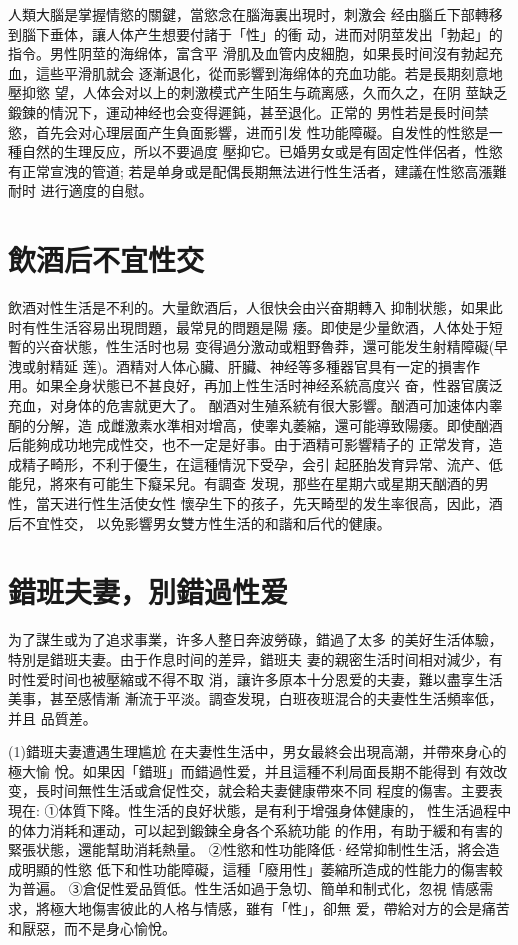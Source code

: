 \documentclass[12pt,UTF8]{ctexbook}
\begin{document}
人類大腦是掌握情慾的關鍵，當慾念在腦海裏出現时，刺激会
经由腦丘下部轉移到腦下垂体，讓人体产生想要付諸于「性」的衝
动，进而对阴莖发出「勃起」的指令。男性阴莖的海绵体，富含平
滑肌及血管内皮細胞，如果長时间沒有勃起充血，這些平滑肌就会
逐漸退化，從而影響到海绵体的充血功能。若是長期刻意地壓抑慾
望，人体会对以上的刺激模式产生陌生与疏离感，久而久之，在阴
莖缺乏鍛鍊的情況下，運动神经也会变得遲鈍，甚至退化。正常的
男性若是長时间禁慾，首先会对心理层面产生負面影響，进而引发
性功能障礙。自发性的性慾是一種自然的生理反应，所以不要過度
壓抑它。已婚男女或是有固定性伴侶者，性慾有正常宣洩的管道;
若是单身或是配偶長期無法进行性生活者，建議在性慾高漲難耐时
进行適度的自慰。

\section{飲酒后不宜性交}

飲酒对性生活是不利的。大量飲酒后，人很快会由兴奋期轉入
抑制状態，如果此时有性生活容易出現問題，最常見的問題是陽
痿。即使是少量飲酒，人体处于短暫的兴奋状態，性生活时也易
变得過分激动或粗野魯莽，還可能发生射精障礙(早洩或射精延
莲)。酒精对人体心臟、肝臟、神经等多種器官具有一定的損害作
用。如果全身状態已不甚良好，再加上性生活时神经系統高度兴
奋，性器官廣泛充血，对身体的危害就更大了。
酗酒对生殖系統有很大影響。酗酒可加速体内睾酮的分解，造
成雌激素水準相对增高，使睾丸萎縮，還可能導致陽痿。即使酗酒
后能夠成功地完成性交，也不一定是好事。由于酒精可影響精子的
正常发育，造成精子畸形，不利于優生，在這種情況下受孕，会引
起胚胎发育异常、流产、低能兒，將來有可能生下癡呆兒。有調查
发現，那些在星期六或星期天酗酒的男性，當天进行性生活使女性
懷孕生下的孩子，先天畸型的发生率很高，因此，酒后不宜性交，
以免影響男女雙方性生活的和諧和后代的健康。

\section{錯班夫妻，別錯過性爱}

为了謀生或为了追求事業，许多人整日奔波勞碌，錯過了太多
的美好生活体驗，特別是錯班夫妻。由于作息时间的差异，錯班夫
妻的親密生活时间相对減少，有时性爱时间也被壓縮或不得不取
消，讓许多原本十分恩爱的夫妻，難以盡享生活美事，甚至感情漸
漸流于平淡。調查发現，白班夜班混合的夫妻性生活頻率低，并且
品質差。

(1)錯班夫妻遭遇生理尴尬
在夫妻性生活中，男女最終会出現高潮，并帶來身心的極大愉
悅。如果因「錯班」而錯過性爱，并且這種不利局面長期不能得到
有效改变，長时间無性生活或倉促性交，就会耠夫妻健康帶來不同
程度的傷害。主要表現在:
①体質下降。性生活的良好状態，是有利于增强身体健康的，
性生活過程中的体力消耗和運动，可以起到鍛鍊全身各个系統功能
的作用，有助于緩和有害的緊張状態，還能幫助消耗熱量。
②性慾和性功能降低·经常抑制性生活，將会造成明顯的性慾
低下和性功能障礙，這種「廢用性」萎縮所造成的性能力的傷害較
为普遍。
③倉促性爱品質低。性生活如過于急切、簡单和制式化，忽視
情感需求，將極大地傷害彼此的人格与情感，雖有「性」，卻無
爱，帶給对方的会是痛苦和厭惡，而不是身心愉悅。
\end{document}
